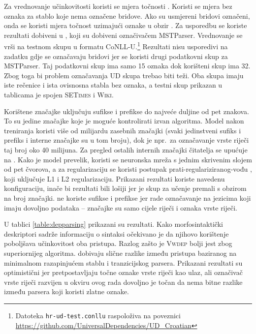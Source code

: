 Za vrednovanje učinkovitosti koristi se mjera točnosti . Koristi
se mjera bez oznaka  za stablo koje nema
označene bridove. Ako su usmjereni bridovi označeni, onda se koristi mjera
točnost uzimajući oznake u obzir . Za
usporedbu se koriste rezultati dobiveni u \citep{agic2013three}, koji su dobiveni
označivačem MSTParser. Vrednovanje se vrši na testnom skupu u formatu CoNLL-U.\footnote{Datoteka \texttt{hr-ud-test.conllu} raspoloživa na poveznici
\url{https://github.com/UniversalDependencies/UD_Croatian}} Rezultati nisu
usporedivi na zadatku gdje se označavaju bridovi jer se koristi drugi podatkovni
skup za MSTParser. Taj podatkovni skup ima samo 15 oznaka dok korišteni skup ima
32. Zbog toga bi problem označavanja UD skupa trebao biti teži. Oba skupa imaju
iste rečenice i ista ovisnosna stabla bez oznaka, a testni skup prikazan u
tablicama je spojen \textsc{SETimes} i \textsc{Wiki}.

Korištene značajke uključuju sufikse i prefikse do najveće duljine od pet
znakova. To su jedine značajke koje je moguće kontrolirati izvan algoritma.
Model nakon treniranja koristi više od milijardu zasebnih značajki (svaki
jedinstveni sufiks i prefiks i interne značajke su u tom broju), dok je npr.~za
označavanje vrste riječi taj broj oko 40 milijuna. Za pregled ostalih internih
značajki čitatelja se upućuje na \citep{chang2015learning}. Kako je model
prevelik, koristi se neuronska mreža s jednim skrivenim slojem od pet čvorova, a
za regularizaciju se koristi postupak prati-regulariziranog-vođu , koji uključuje L1 i L2 regularizaciju. Prikazani
rezultati koriste navedenu konfiguraciju, inače bi rezultati bili lošiji jer je
skup za učenje premali s obzirom na broj značajki. \citet{chang2015learning} ne
koriste sufikse i prefikse jer rade označavanje na jezicima koji imaju dovoljno
podataka -- značajke su samo cijele riječi i oznaka vrste riječi.

U tablici \ref{table:depparsing} prikazani su rezultati. Kako morfosintaktički
deskriptori sadrže informaciju o sintaksi očekivano je da njihovo korištenje
poboljšava učinkovitost oba pristupa. Razlog zašto je \textsc{Vwdep} bolji jest
zbog superiornijeg algoritma. \citet{cer2010parsing} dobivaju slične razlike
između pristupa baziranog na minimalnom razapinjućem stablu i tranzicijskog
parsera. Prikazani rezultati su optimistični jer pretpostavljaju točne oznake
vrste riječi kao ulaz, ali označivač vrste riječi razvijen u okviru ovog rada
dovoljno je točan da nema bitne razlike između parsera koji koristi zlatne
oznake.

